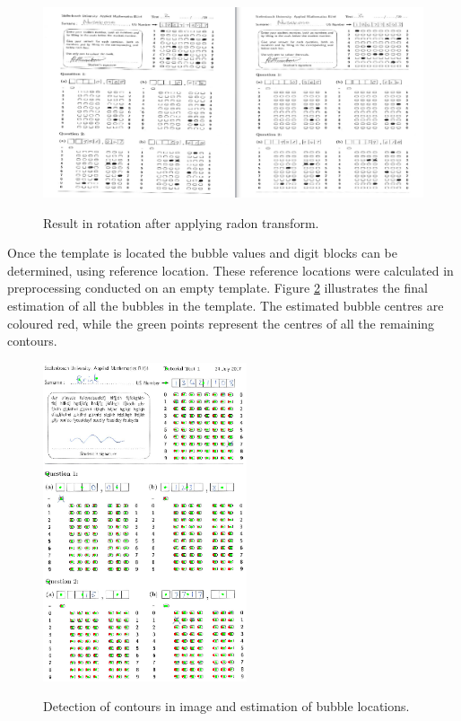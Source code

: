 \begin{figure}
  \centering
  \includegraphics[width=14cm]{Rotation}\\
  \caption{Result in rotation after applying radon transform.}
  \label{fig:rotate}
\end{figure}

Once the template is located the bubble values and digit blocks can be determined, using reference location. These reference locations were calculated in preprocessing conducted on an empty template. Figure \ref{fig:FinalEstimate} illustrates the final estimation of all the bubbles in the template. The estimated bubble centres are coloured red, while the green points represent the centres of all the remaining contours.

\begin{figure}
  \centering
  \includegraphics[width=6cm]{FinalEstimate}\\
  \caption{Detection of contours in image and estimation of bubble locations.}
  \label{fig:FinalEstimate}
\end{figure}

